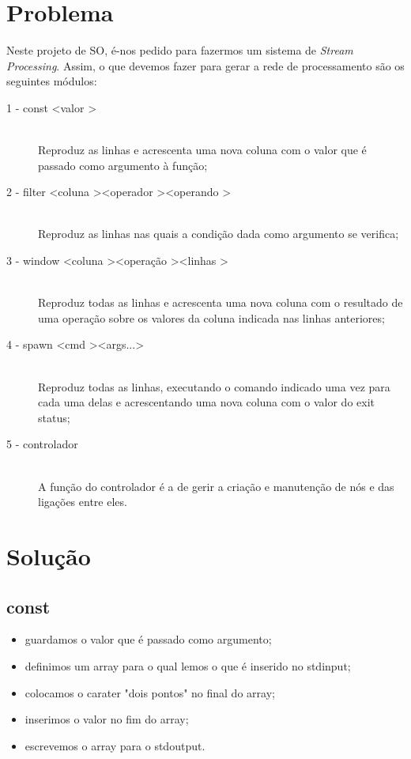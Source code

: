 \documentclass[a4paper]{article}
\begin{document}
\section{Problema}
\label{sec:problema}
Neste projeto de SO, é-nos pedido para fazermos um sistema de \textit{Stream Processing}. Assim, o que devemos fazer para gerar a rede de processamento são os seguintes módulos:
\begin{description}
\item[1 - const \textless valor \textgreater]\hfill \\
Reproduz as linhas e acrescenta uma nova coluna com o valor que é passado como argumento à função;
\item[2 - filter \textless coluna \textgreater \textless operador \textgreater \textless operando \textgreater]\hfill \\
Reproduz as linhas nas quais a condição dada como argumento se verifica;
\item[3 - window \textless coluna \textgreater \textless operação \textgreater \textless linhas \textgreater]\hfill \\
Reproduz todas as linhas e acrescenta uma nova coluna com o resultado de uma operação sobre os valores da coluna indicada nas linhas anteriores;
\item[4 - spawn \textless cmd \textgreater \textless args...\textgreater]\hfill \\
Reproduz todas as linhas, executando o comando indicado uma vez para cada uma delas e acrescentando uma nova coluna com o valor do exit status;
\item[5 - controlador]\hfill \\
A função do controlador é a de gerir a criação e manutenção de nós e das ligações entre eles.
\end{description}

\section{Solução}
\label{sec:solucao}

\subsection{const}

\begin{itemize}
\item guardamos o valor que é passado como argumento;
\item definimos um array para o qual lemos o que é inserido no stdinput;
\item colocamos o carater "dois pontos" no final do array;
\item inserimos o valor no fim do array;
\item escrevemos o array para o stdoutput.
\end{itemize}
\end{document}
